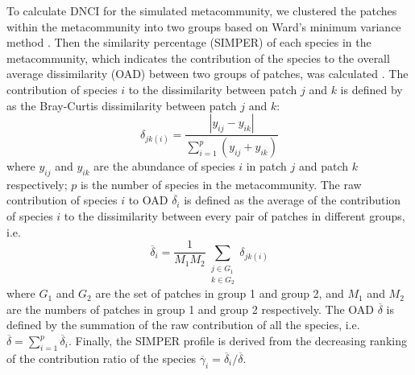 To calculate DNCI for the simulated metacommunity, we clustered the patches within the metacommunity into two groups based on Ward's minimum variance method \citep[pp360]{legendre2012numerical}. Then the similarity percentage (SIMPER) of each species in the metacommunity, which indicates the contribution of the species to the overall average dissimilarity (OAD) between two groups of patches, was calculated \citep{clarke1993non}. The contribution of species $i$ to the dissimilarity between patch $j$ and $k$ is defined by \citet{clarke1993non} as the Bray-Curtis dissimilarity between patch $j$ and $k$:
\[
\delta_{jk(i)} = \dfrac{|y_{ij} - y_{ik}|}{\sum_{i=1}^p (y_{ij}+y_{ik})}
\]
where $y_{ij}$ and $y_{ik}$ are the abundance of species $i$ in patch $j$ and patch $k$ respectively; $p$ is the number of species in the metacommunity. The raw contribution of species $i$ to OAD $\overline{\delta_i}$ is defined as the average of the contribution of species $i$ to the dissimilarity between every pair of patches in different groups, i.e.
\[
\overline{\delta}_i = \dfrac{1}{M_1M_2}\sum_{\substack{j \in G_1\\ k \in G_2}}\delta_{jk(i)}
\]
where $G_1$ and $G_2$ are the set of patches in group 1 and group 2, and $M_1$ and $M_2$ are the numbers of patches in group 1 and group 2 respectively. The OAD $\overline{\delta}$ is defined by the summation of the raw contribution of all the species, i.e. $\overline{\delta} = \sum_{i=1}^p \overline{\delta}_i$. Finally, the SIMPER profile is derived from the decreasing ranking of the contribution ratio of the species $\overline{\gamma}_i = \overline{\delta}_i/\overline{\delta}$.

